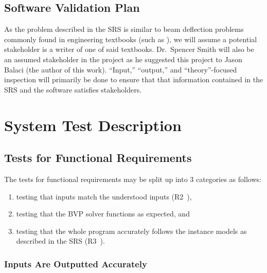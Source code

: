 \documentclass[12pt, titlepage]{article}
\begin{document}
\subsection{Software Validation Plan}

As the problem described in the SRS is similar to beam deflection problems
commonly found in engineering textbooks (such as \cite{BeerJohnston1981}), we
will assume a potential stakeholder is a writer of one of said textbooks.
Dr.~Spencer Smith will also be an assumed stakeholder in the project as he
suggested this project to Jason Balaci (the author of this work). ``Input,''
``output,'' and ``theory''-focused inspection will primarily be done to ensure
that that information contained in the SRS and the software satisfies
stakeholders.

\newpage{}

\section{System Test Description}

\subsection{Tests for Functional Requirements}

The tests for functional requirements may be split up into 3 categories as
follows:

\begin{enumerate}
    
    \item testing that inputs match the understood inputs
          (R2~\cite{BalaciBeamBendingSRS2023}),

    \item testing that the BVP solver functions as expected, and
    
    \item testing that the whole program accurately follows the instance models
          as described in the SRS (R3~\cite{BalaciBeamBendingSRS2023}).
    
\end{enumerate}

\subsubsection{Inputs Are Outputted Accurately}
\end{document}
